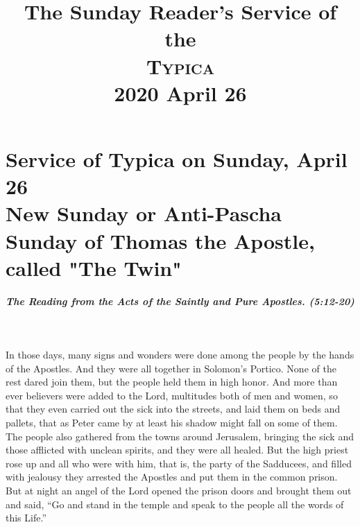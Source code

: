 \documentclass[twoside, letterpaper, 12pt]{report}
\title{The Sunday Reader's Service of the \\ \textsc{Typica} \\ 2020 April 26}
\date{}
\author{}
\begin{document}
\maketitle
\pagestyle{empty} %
\cleardoublepage
\pagestyle{plain}
\setcounter{page}{1} %
\chapter*{Service of Typica on Sunday, April 26 \\
          New Sunday or Anti-Pascha\\
          Sunday of Thomas the Apostle, called "The Twin"}

\readerline{\throughtheprayers{}}

\trisagionNeedsAmen[reader][prepentecost]








\paragraph{The Reading from the Acts of the Saintly and Pure Apostles. (5:12-20)}\mbox{}\\

\begin{maybetwocolumns}
In those days, many signs and wonders were done among the people by the hands of the
Apostles. And they were all together in Solomon’s Portico. None of the rest dared join them, but
the people held them in high honor. And more than ever believers were added to the Lord,
multitudes both of men and women, so that they even carried out the sick into the streets, and laid
them on beds and pallets, that as Peter came by at least his shadow might fall on some of them.
The people also gathered from the towns around Jerusalem, bringing the sick and those afflicted
with unclean spirits, and they were all healed. But the high priest rose up and all who were with
him, that is, the party of the Sadducees, and filled with jealousy they arrested the Apostles and put
them in the common prison. But at night an angel of the Lord opened the prison doors and brought
them out and said, “Go and stand in the temple and speak to the people all the words of this Life.”
\end{maybetwocolumns}
\end{document}
